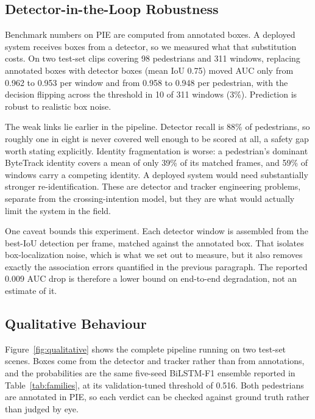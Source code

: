 \documentclass[mti,article,submit,moreauthors]{Definitions/mdpi}
\begin{document}
\subsection{Detector-in-the-Loop Robustness}
\label{sec:detector}

Benchmark numbers on PIE are computed from annotated boxes. A deployed system receives boxes from a detector, so we measured what that substitution costs. On two test-set clips covering 98 pedestrians and 311 windows, replacing annotated boxes with detector boxes (mean IoU 0.75) moved AUC only from 0.962 to 0.953 per window and from 0.958 to 0.948 per pedestrian, with the decision flipping across the threshold in 10 of 311 windows (3\%). Prediction is robust to realistic box noise.

The weak links lie earlier in the pipeline. Detector recall is 88\% of pedestrians, so roughly one in eight is never covered well enough to be scored at all, a safety gap worth stating explicitly. Identity fragmentation is worse: a pedestrian's dominant ByteTrack identity covers a mean of only 39\% of its matched frames, and 59\% of windows carry a competing identity. A deployed system would need substantially stronger re-identification. These are detector and tracker engineering problems, separate from the crossing-intention model, but they are what would actually limit the system in the field.

One caveat bounds this experiment. Each detector window is assembled from the best-IoU detection per frame, matched against the annotated box. That isolates box-localization noise, which is what we set out to measure, but it also removes exactly the association errors quantified in the previous paragraph. The reported 0.009 AUC drop is therefore a lower bound on end-to-end degradation, not an estimate of it.

\subsection{Qualitative Behaviour}
\label{sec:qualitative}

Figure~\ref{fig:qualitative} shows the complete pipeline running on two test-set scenes. Boxes come from the detector and tracker rather than from annotations, and the probabilities are the same five-seed BiLSTM-F1 ensemble reported in Table~\ref{tab:families}, at its validation-tuned threshold of 0.516. Both pedestrians are annotated in PIE, so each verdict can be checked against ground truth rather than judged by eye.
\end{document}
